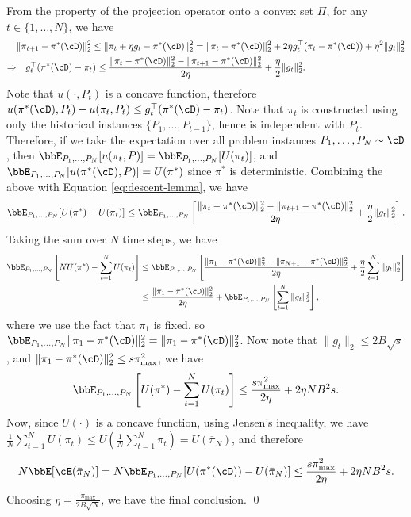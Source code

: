     From the property of the projection operator onto a convex set $\Pi$, for any $t  \in \{1, \dots, N\}$, we have
    \begin{equation} \label{eq:descent-lemma}
        \begin{aligned}
            &\|\pi_{t + 1} - \pi^*(\cD)\|_2^2 \leq \|\pi_{t} + \eta g_t - \pi^*(\cD)\|_2^2 = \|\pi_t - \pi^*(\cD)\|_2^2 + 2\eta g_t^\top (\pi_t - \pi^*(\cD)) +\eta^2 \|g_t\|_2^2 \\
            \Rightarrow & \quad g_t^\top (\pi^*(\cD) - \pi_t) \leq \frac{\|\pi_t - \pi^*(\cD)\|_2^2 - \|\pi_{t + 1} - \pi^*(\cD)\|_2^2}{2\eta} + \frac{\eta}{2} \|g_t\|_2^2.
        \end{aligned}
    \end{equation}
    Note that $u(\cdot, P_t)$ is a concave function, therefore $u(\pi^*(\cD), P_t) - u(\pi_t, P_t) \leq g^\top_t (\pi^*(\cD) - \pi_t)$. Note that $\pi_t$ is constructed using only the historical instances $\{P_1, \dots, P_{t - 1}\}$, hence is independent with $P_{t}$. Therefore, if we take the expectation over all problem instances $P_1, \dots, P_N \sim \cD$, then $\bbE_{P_1,\dots, P_N}[u(\pi_t, P)] = \bbE_{P_1,\dots, P_N}[U(\pi_t)]$, and $\bbE_{P_1,\dots, P_N}[u(\pi^*(\cD), P)] = U(\pi^*)$ since $\pi^*$ is deterministic. Combining the above with Equation \ref{eq:descent-lemma}, we have
    \begin{equation*}
        \bbE_{P_1,\dots, P_N}[U(\pi^*) - U(\pi_t)] \leq \bbE_{P_1,\dots, P_N}\left[\frac{\|\pi_t - \pi^*(\cD)\|_2^2 - \|\pi_{t+ 1} - \pi^*(\cD)\|_2^2}{2\eta} + \frac{\eta}{2}\|g_t\|_2^2\right].
    \end{equation*}
    Taking the sum over $N$ time steps, we have
    \begin{equation*}
        \begin{aligned}
            \bbE_{P_1,\dots, P_N}\left[N U(\pi^*) - \sum_{t = 1}^N U(\pi_t)\right] &\leq  \bbE_{P_1,\dots, P_N} \left[\frac{\|\pi_1 - \pi^*(\cD)\|_2^2 - \|\pi_{N + 1} - \pi^*(\cD)\|_2^2}{2\eta} + \frac{\eta}{2}\sum_{t = 1}^N \|g_t\|_2^2\right] \\
            &\leq  \frac{\|\pi_1 - \pi^*(\cD)\|_2^2}{2\eta} + \bbE_{P_1,\dots, P_N}\left[\sum_{t = 1}^N \|g_t\|_2^2\right],
        \end{aligned}
    \end{equation*}
    where we use the fact that $\pi_1$ is fixed, so $\bbE_{P_1,\dots, P_N}\|\pi_1 - \pi^*(\cD)\|_2^2 = \|\pi_1 - \pi^*(\cD)\|_2^2$. Now note that $\|g_t\|_2 \leq 2B\sqrt{s}$, and $\|\pi_1 - \pi^*(\cD)\|_2^2 \leq s\pi_{\max}^2$, we have
    \[
        \bbE_{P_1,\dots, P_N}\left[U(\pi^*) - \sum_{t = 1}^N U(\pi_t)\right] \leq \frac{s\pi_{\max}^2}{2\eta} + 2\eta NB^2s.
    \]
    Now, since $U(\cdot)$ is a concave function, using Jensen's inequality, we have $\frac{1}{N}\sum_{t = 1}^N U(\pi_t) \leq U\left(\frac{1}{N}\sum_{t =1}^N \pi_t\right) = U(\overline{\pi}_N)$, and therefore
    \[
       N \bbE[\cE(\bar{\pi}_N)] =  N \bbE_{P_1, \dots, P_N}[U(\pi^*(\cD)) - U(\bar{\pi}_N)] \leq \frac{s\pi_{\max}^2}{2\eta} + 2\eta NB^2s.
    \]
    Choosing $\eta = \frac{\pi_{\max}}{2B\sqrt{N}}$, we have the final conclusion. 
\qed

